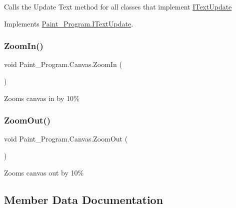 Calls the Update Text method for all classes that implement \mbox{\hyperlink{interface_paint___program_1_1_i_text_update}{I\+Text\+Update}} 



Implements \mbox{\hyperlink{interface_paint___program_1_1_i_text_update_ad1e94db137571608917117e9a6f7479b}{Paint\+\_\+\+Program.\+I\+Text\+Update}}.

\mbox{\label{class_paint___program_1_1_canvas_a2c266c354fa86bc892a2eebf183d04f3}} 
\subsubsection{\texorpdfstring{Zoom\+In()}{ZoomIn()}}
{\footnotesize\ttfamily void Paint\+\_\+\+Program.\+Canvas.\+Zoom\+In (\begin{DoxyParamCaption}{ }\end{DoxyParamCaption})\hspace{0.3cm}{\ttfamily [inline]}}



Zooms canvas in by 10\% 

\mbox{\label{class_paint___program_1_1_canvas_a6470498d99b7f3fb2d2b26116c2abb44}} 
\subsubsection{\texorpdfstring{Zoom\+Out()}{ZoomOut()}}
{\footnotesize\ttfamily void Paint\+\_\+\+Program.\+Canvas.\+Zoom\+Out (\begin{DoxyParamCaption}{ }\end{DoxyParamCaption})\hspace{0.3cm}{\ttfamily [inline]}}



Zooms canvas out by 10\% 



\subsection{Member Data Documentation}
\mbox{\label{class_paint___program_1_1_canvas_a0cc3e58e865cf5a755d4d9f35f70238a}} 
